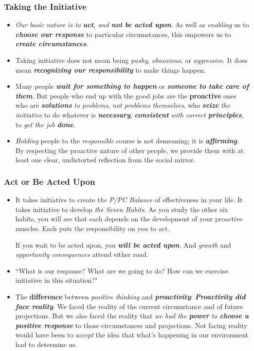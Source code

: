 \documentclass[11pt]{article}
\begin{document}
\subsubsection{Taking the Initiative}
\begin{itemize}
\item \emph{Our basic nature is to \textbf{act}, and \textbf{not} \textbf{be acted upon}}. As well as \emph{enabling} us to \emph{\textbf{choose our response}} to particular circumstances, this empowers us to \emph{\textbf{create circumstances}}.

\item Taking initiative does not mean being \emph{pushy}, \emph{obnoxious}, or \emph{aggressive}. It does mean \emph{\textbf{recognizing our responsibility}} to make things happen.

\item Many people \emph{\textbf{wait for something to happen}} or \emph{\textbf{someone to take care of them}}. But people who end up with the good jobs are the \textbf{proactive} ones who are \emph{\textbf{solutions} to problems}, \emph{not problems themselves}, who \emph{\textbf{seize} the initiative} to do whatever is \emph{\textbf{necessary}}, \emph{\textbf{consistent} with correct \textbf{principles}}, to \emph{get the job \textbf{done}}.

\item \emph{Holding} people to the \emph{responsible} course is not demeaning; it is \emph{\textbf{affirming}}. By respecting the proactive nature of other people, we provide them with at least one clear, undistorted reflection from the social mirror.
\end{itemize}
\subsubsection{Act or Be Acted Upon}
\begin{itemize}
\item It takes initiative to create t\emph{he P/PC Balance} of effectiveness in your life. It takes initiative to develop \emph{the Seven Habits}. As you study the other six habits, you will see that each depends on the development of your proactive muscles. Each puts the responsibility on you to act. 

If you wait to be acted upon, you \emph{\textbf{will be acted upon}}. And \emph{growth} and \emph{opportunity consequences} attend either road.

\item ``What is our response? What are we going to do? How can we exercise initiative in this situation?"

\item The \textbf{difference} between \emph{positive thinking} and \emph{\textbf{proactivity}}: \emph{\textbf{Proactivity did face reality}}. We faced the reality of the current circumstance and of future projections. But we also faced the reality that \emph{we had the \textbf{power} to \textbf{choose a positive response}} to those circumstances and projections. Not facing reality would have been to \emph{accept} the idea that what's happening in our environment had to determine us.
\end{itemize}
\end{document}
